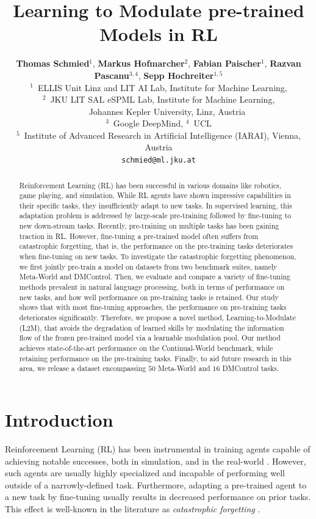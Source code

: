 \documentclass{article}
\title{Learning to Modulate pre-trained Models in RL}
\author{
\hspace{-0.67cm}
  \textbf{Thomas Schmied}$^{1}$,
  \textbf{Markus Hofmarcher}$^{2}$,
  \textbf{Fabian Paischer}$^{1}$,
  \textbf{Razvan Pascanu}$^{3,4}$,
  \textbf{Sepp Hochreiter}$^{1,5}$ \\
\hspace{-0.67cm}
  $^{1}$~ELLIS Unit Linz and LIT AI Lab, Institute for Machine Learning,\\
\hspace{-0.67cm}
  $^{2}$~JKU LIT SAL eSPML Lab, Institute for Machine Learning,\\
\hspace{-0.67cm}
                  ~~~~Johannes Kepler University, Linz, Austria\\
\hspace{-0.67cm}
  $^{3}$~Google DeepMind, $^{4}$~UCL\\
\hspace{-0.67cm}
  $^{5}$~Institute of Advanced Research in Artificial Intelligence (IARAI), Vienna, Austria\\
\hspace{-0.67cm}
  \texttt{schmied@ml.jku.at}
}
\begin{document}
\maketitle



\begin{abstract}
Reinforcement Learning (RL) has been successful in various domains like robotics, game playing, and simulation.
While RL agents have shown impressive capabilities in their specific tasks, they insufficiently adapt to new tasks.
In supervised learning, this adaptation problem is addressed by large-scale pre-training followed by fine-tuning to new down-stream tasks.
Recently, pre-training on multiple tasks has been gaining traction in RL.
However, fine-tuning a pre-trained model often suffers from catastrophic forgetting, that is, the performance on the pre-training tasks deteriorates when fine-tuning on new tasks.
To investigate the catastrophic forgetting phenomenon, we first jointly pre-train a model on datasets from two benchmark suites, namely Meta-World and DMControl.
Then, we evaluate and compare a variety of fine-tuning methods prevalent in natural language processing, both in terms of performance on new tasks, and how well performance on pre-training tasks is retained.
Our study shows that with most fine-tuning approaches, the performance on pre-training tasks deteriorates significantly.
Therefore, we propose a novel method, Learning-to-Modulate (L2M), that avoids the degradation of learned skills by modulating the information flow of the frozen pre-trained model via a learnable modulation pool. 
Our method achieves state-of-the-art performance on the Continual-World benchmark, while retaining performance on the pre-training tasks.
Finally, to aid future research in this area, we release a dataset encompassing $50$ Meta-World and $16$ DMControl tasks.
\end{abstract}

\section{Introduction}
Reinforcement Learning (RL) has been instrumental in training agents capable of achieving notable successes, both in simulation, and in the real-world \citep{Silver:16, Vinyals:19,Berner:19,Arjona:19,Bellemare:20,Degrave:2022}. 
However, such agents are usually highly specialized and incapable of performing well outside of a narrowly-defined task.
Furthermore, adapting a pre-trained agent to a new task by fine-tuning usually results in decreased performance on prior tasks.
This effect is well-known in the literature as \textit{catastrophic forgetting} \citep{McCloskey:1989}.
\end{document}
